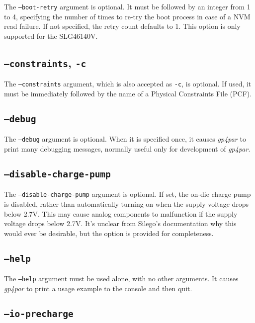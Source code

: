 \documentclass[11pt]{article}
\newcommand{\namestyle}[1]{\textit{#1}}
\begin{document}
The \texttt{--boot-retry} argument is optional. It must be followed by an integer from 1 to 4, specifying the number of times
to re-try the boot process in case of a NVM read failure. If not specified, the retry count defaults to 1. This option is
only supported for the SLG46140V.

\subsection{\texttt{--constraints}, \texttt{-c}}

The \texttt{--constraints} argument, which is also accepted as \texttt{-c}, is optional. If used, it must be immediately followed
by the name of a Physical Constraints File (PCF).

\subsection{\texttt{--debug}}

The \texttt{--debug} argument is optional. When it is specified once, it causes \namestyle{gp4par} to print
many debugging messages, normally useful only for development of \namestyle{gp4par}.

\subsection{\texttt{--disable-charge-pump}}

The \texttt{--disable-charge-pump} argument is optional. If set, the on-die charge pump is disabled, rather than
automatically turning on when the supply voltage drops below 2.7V. This may cause analog components to malfunction if the
supply voltage drops below 2.7V. It's unclear from Silego's documentation why this would ever be desirable, but the option
is provided for completeness.

\subsection{\texttt{--help}}

The \texttt{--help} argument must be used alone, with no other arguments. It causes \namestyle{gp4par} to print a usage
example to the console and then quit.

\subsection{\texttt{--io-precharge}}
\end{document}
